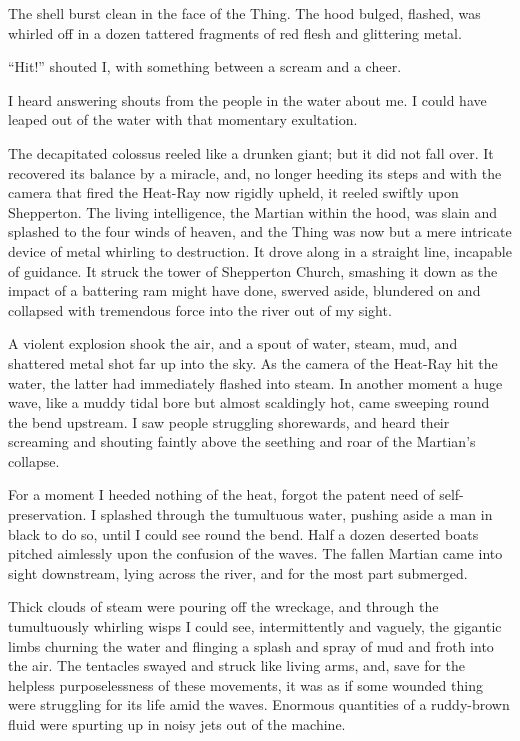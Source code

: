 The shell burst clean in the face of the Thing. The hood bulged,
flashed, was whirled off in a dozen tattered fragments of red flesh
and glittering metal.

``Hit!'' shouted I, with something between a scream and a cheer.

I heard answering shouts from the people in the water about me. I
could have leaped out of the water with that momentary exultation.

The decapitated colossus reeled like a drunken giant; but it did
not fall over. It recovered its balance by a miracle, and, no
longer heeding its steps and with the camera that fired the
Heat-Ray now rigidly upheld, it reeled swiftly upon Shepperton. The
living intelligence, the Martian within the hood, was slain and
splashed to the four winds of heaven, and the Thing was now but a
mere intricate device of metal whirling to destruction. It drove
along in a straight line, incapable of guidance. It struck the
tower of Shepperton Church, smashing it down as the impact of a
battering ram might have done, swerved aside, blundered on and
collapsed with tremendous force into the river out of my sight.

A violent explosion shook the air, and a spout of water, steam,
mud, and shattered metal shot far up into the sky. As the camera of
the Heat-Ray hit the water, the latter had immediately flashed into
steam. In another moment a huge wave, like a muddy tidal bore but
almost scaldingly hot, came sweeping round the bend upstream. I saw
people struggling shorewards, and heard their screaming and
shouting faintly above the seething and roar of the Martian's
collapse.

For a moment I heeded nothing of the heat, forgot the patent need
of self-preservation. I splashed through the tumultuous water,
pushing aside a man in black to do so, until I could see round the
bend. Half a dozen deserted boats pitched aimlessly upon the
confusion of the waves. The fallen Martian came into sight
downstream, lying across the river, and for the most part
submerged.

Thick clouds of steam were pouring off the wreckage, and through
the tumultuously whirling wisps I could see, intermittently and
vaguely, the gigantic limbs churning the water and flinging a
splash and spray of mud and froth into the air. The tentacles
swayed and struck like living arms, and, save for the helpless
purposelessness of these movements, it was as if some wounded thing
were struggling for its life amid the waves. Enormous quantities of
a ruddy-brown fluid were spurting up in noisy jets out of the
machine.

